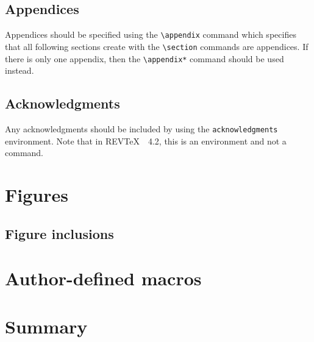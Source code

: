 \documentclass[twocolumn,secnumarabic,amssymb, nobibnotes, aps, prd]{revtex4-2}
\newcommand{\revtex}{REV\TeX\ }
\newcommand{\macro}[1]{\texttt{\textbackslash#1}}
\newcommand{\m}[1]{\macro{#1}}
\newcommand{\env}[1]{\texttt{#1}}
\begin{document}
\subsection{Appendices}
Appendices should be specified using the \m{appendix} command which
specifies that all following sections create with the \m{section}
commands are appendices. If there is only one appendix, then the
\m{appendix*} command should be used instead.

\subsection{Acknowledgments}
Any acknowledgments should be included by using the
\env{acknowledgments} environment. Note that in \revtex~4.2, this is
an environment and not a command.

\section{Figures}
\subsection{Figure inclusions}

\section{Author-defined macros}

\section{Summary}
\end{document}
